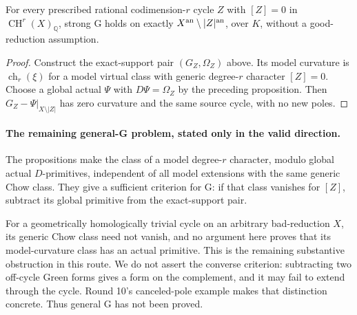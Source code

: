 \begin{corollary}
\label{r11p:chow-zero-G}
For every prescribed rational codimension-$r$ cycle $Z$ with
$[Z]=0$ in $\operatorname{CH}^r(X)_{\mathbb Q}$, strong G holds
on exactly $X^{\rm an}\setminus|Z|^{\rm an}$, over $K$, without
a good-reduction assumption.
\end{corollary}

\begin{proof}
Construct the exact-support pair $(G_Z,\Omega_Z)$ above.
Its model curvature is $\operatorname{ch}_r(\xi)$ for a model
virtual class with generic degree-$r$ character $[Z]=0$.
Choose a global actual $\Psi$ with $D\Psi=\Omega_Z$ by the preceding
proposition.  Then $G_Z-\Psi|_{X\setminus|Z|}$ has zero curvature
and the same source cycle, with no new poles.
\end{proof}

\paragraph{The remaining general-G problem, stated only in the valid direction.}
The propositions make the class of a model degree-$r$ character,
modulo global actual $D$-primitives, independent of all model
extensions with the same generic Chow class.  They give a sufficient
criterion for G: if that class vanishes for $[Z]$, subtract its global
primitive from the exact-support pair.

For a geometrically homologically trivial cycle on an arbitrary
bad-reduction $X$, its generic Chow class need not vanish, and no
argument here proves that its model-curvature class has an actual
primitive.  This is the remaining substantive obstruction in this
route.  We do not assert the converse criterion: subtracting two
off-cycle Green forms gives a form on the complement, and it may fail
to extend through the cycle.  Round 10's canceled-pole example makes
that distinction concrete.  Thus general G has not been proved.

